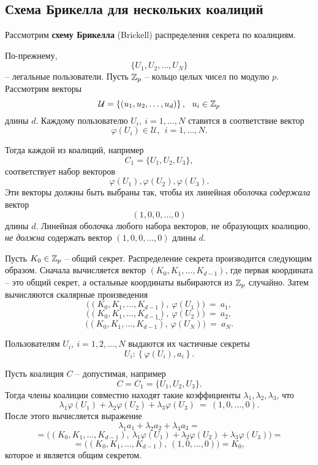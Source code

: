 \subsection{Схема Брикелла для нескольких коалиций}

Рассмотрим \textbf{схему Брикелла} (Brickell) распределения секрета по коалициям.

По-прежнему,
    \[ \{ U_1, U_2, \dots, U_N \} \]
-- легальные пользователи. Пусть $\mathbb{Z}_p$ -- кольцо целых чисел по модулю $p$. Рассмотрим векторы
    \[ \mathcal{U} = \left\{ (u_1, u_2, \dots, u_d) \right\}, ~~ u_i \in \mathbb{Z}_p \]
длины $d$. Каждому пользователю $U_i, ~ i = 1, \dots, N$ ставится в соответствие вектор
    \[ \varphi(U_i) \in \mathcal{U}, ~~ i = 1, \dots, N. \]

Тогда каждой из коалиций, например
    \[ C_1 = \{ U_1, U_2, U_3 \}, \]
соответствует набор векторов
    \[ \varphi(U_1), \varphi(U_2), \varphi(U_3). \]
Эти векторы должны быть выбраны так, чтобы их линейная оболочка \emph{содержала} вектор
    \[ (1, 0, 0, \dots, 0) \]
длины $d$. Линейная оболочка любого набора векторов, не образующих коалицию, \emph{не должна} содержать вектор $(1, 0, 0, \dots, 0)$ длины $d$.

Пусть $K_0 \in \mathbb{Z}_p$ -- общий секрет. Распределение секрета производится следующим образом. Сначала вычисляется вектор $(K_0, K_1, \dots, K_{d-1})$, где первая координата -- это общий секрет, а остальные координаты выбираются из $\mathbb{Z}_p$ случайно. Затем вычисляются скалярные произведения
\[
    \Big( \left( K_0, K_1, \dots, K_{d-1} \right), ~ \varphi(U_1) \Big) ~=~ a_1,
\] \[
    \Big( \left( K_0, K_1, \dots, K_{d-1} \right), ~ \varphi(U_2) \Big) ~=~ a_2,
\] \[
    \dots
\] \[
    \Big( \left( K_0, K_1, \dots, K_{d-1} \right), ~ \varphi(U_N) \Big) ~=~ a_N.
\]

Пользователям $U_i, ~ i = 1, 2, \dots, N$ выдаются их частичные секреты
    \[ U_i \colon \left\{ \varphi(U_i), a_i \right\}. \]

Пусть коалиция $C$ -- допустимая, например
    \[ C = C_1 = \{ U_1, U_2, U_3 \}. \]
Тогда члены коалиции совместно находят такие коэффициенты $\lambda_1, \lambda_2, \lambda_3$, что
    \[ \lambda_1\varphi(U_1)+\lambda_2\varphi(U_2)+\lambda_3\varphi(U_3) ~=~ (1,0, \dots, 0). \]
После этого вычисляется выражение
\[
    \lambda_1 a_1 + \lambda_2 a_2 + \lambda_3 a_3 =
\] \[
    = \Big( \left( K_0, K_1, \dots, K_{d-1} \right), ~ \lambda_1 \varphi(U_1) + \lambda_2 \varphi(U_2) + \lambda_3 \varphi(U_3) \Big) =
\] \[
    = \Big( \left( K_0, K_1, \dots, K_{d-1} \right), ~ \left( 1, 0, \dots, 0 \right) \Big) =  K_0,
\]
которое и является общим секретом.

